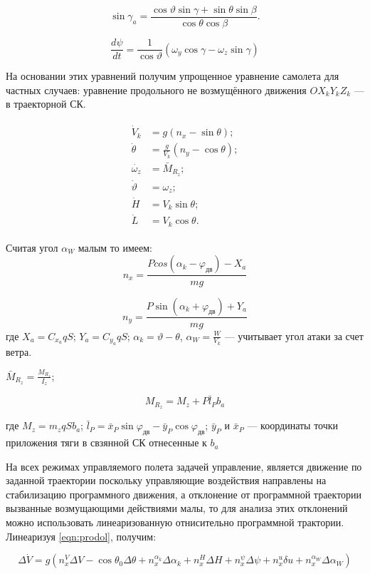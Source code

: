 \documentclass{article}
\begin{document}
\[
\sin{\gamma_a} = \frac{\cos{\vartheta} \sin{\gamma} + \sin{\theta} \sin{\beta}}{\cos{\theta} \cos{\beta}}.
\]

\[
\frac{d\psi}{dt} = \frac{1}{\cos{\vartheta}}(\omega_y \cos{\gamma} - \omega_z \sin{\gamma}) 
\]

На основании этих уравнений получим упрощенное уравнение самолета для частных случаев:
уравнение продольного не возмущённого движения $OX_k Y_k Z_k$ --- в траекторной СК.

\begin{align}
\label{eqn:prodol}
\begin{split}
\dot{V}_k&= g(n_x - \sin{\theta});
\\
\dot{\theta}&= \frac{g}{V_k} (n_y - \cos{\theta});
\\
\dot{\omega_z}&= \bar{M}_{R_z};
\\
\dot{\vartheta}&= \omega_{z};
\\
\dot{H}&= V_k \sin{\theta};
\\
\dot{L}&= V_k \cos{\theta}.
\end{split}
\end{align}

Считая угол $\alpha_W$ малым то имеем:
\[
n_x = \frac{Pcos{(\alpha_k - \varphi_{дв})} - X_a}{mg}
\]

\[
n_y = \frac{P \sin{(\alpha_k + \varphi_{дв})} + Y_a}{mg}
\]
где $X_a = C_{x_a} q S$; $Y_a = C_{y_a} q S$; $\alpha_k = \vartheta - \theta$, 
$\alpha_W = \frac{W}{V_k}$ --- учитывает угол атаки за счет ветра.

$\bar{M}_{R_z} = \frac{M_{R_z}}{I_z}$; 

\[
M_{R_z} = M_z + P \bar{l}_P b_a
\]

где $M_z = m_zqS b_a$; $\bar{l}_P = \bar{x}_P \sin{\varphi_{дв}} - \bar{y}_P \cos{\varphi_{дв}}$; $\bar{y}_P$ и $\bar{x}_P$ --- координаты точки приложения тяги в свзянной СК отнесенные к $b_a$

На всех режимах управляемого полета задачей управление, является движение по заданной траектории поскольку управляющие воздействия направлены на стабилизацию программного движения, а отклонение от программной траектории вызванные возмущающими действиями малы, то для анализа этих отклонений можно использовать линеаризованную отнисительно программной трактории. Линеаризуя \eqref{eqn:prodol}, получим: 

\[
\Delta \dot{V} = g(n_x^V \Delta V - \cos{\theta_0}\Delta \theta + n_x^{\alpha_k} \Delta \alpha_k + n_x^{H} \Delta H + n_x^{\psi}\Delta \psi + n_x^{u} \delta u + n_x^{\alpha_W} \Delta \alpha_W )
\]
\end{document}
